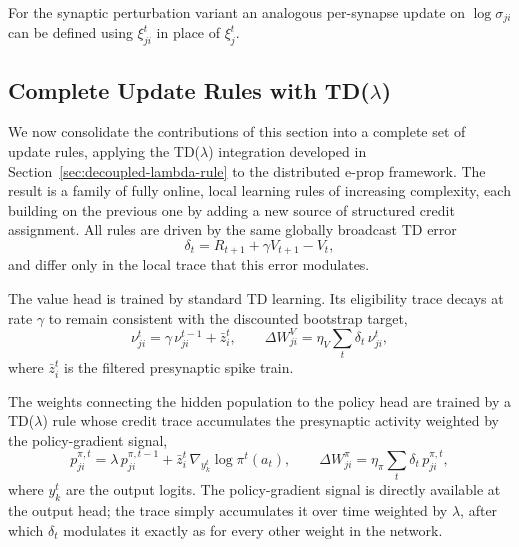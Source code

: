     For the synaptic perturbation variant an analogous per-synapse update on
    $\log\sigma_{ji}$ can be defined using $\xi_{ji}^t$ in place of $\xi_j^t$.

    \subsection{Complete Update Rules with TD($\lambda$)}
    \label{subsec:complete_update_rules}
    
    We now consolidate the contributions of this section into a complete set of
    update rules, applying the TD($\lambda$) integration developed in
    Section~\ref{sec:decoupled-lambda-rule} to the distributed e-prop framework. The
    result is a family of fully online, local learning rules of increasing
    complexity, each building on the previous one by adding a new source of
    structured credit assignment. All rules are driven by the same globally
    broadcast TD error
    \begin{equation}
    \delta_t = R_{t+1} + \gamma V_{t+1} - V_t,
    \label{eq:complete-tderror}
    \end{equation}
    and differ only in the local trace that this error modulates.
    
    The value head is trained by standard TD learning. Its eligibility trace decays
    at rate $\gamma$ to remain consistent with the discounted bootstrap target,
    \begin{equation}
    \nu_{ji}^t = \gamma\, \nu_{ji}^{t-1} + \bar{z}_i^t,
    \qquad
    \Delta W_{ji}^V = \eta_V \sum_t \delta_t\, \nu_{ji}^t,
    \label{eq:complete-critic}
    \end{equation}
    where $\bar{z}_i^t$ is the filtered presynaptic spike train.
    
    The weights connecting the hidden population to the policy head are trained by a
    TD($\lambda$) rule whose credit trace accumulates the presynaptic activity
    weighted by the policy-gradient signal,
    \begin{equation}
    p_{ji}^{\pi,t} = \lambda\, p_{ji}^{\pi,t-1}
    + \bar{z}_i^t \, \nabla_{y_k^t} \log \pi^t(a_t),
    \qquad
    \Delta W_{ji}^\pi = \eta_\pi \sum_t \delta_t\, p_{ji}^{\pi,t},
    \label{eq:complete-policy}
    \end{equation}
    where $y_k^t$ are the output logits. The policy-gradient signal is directly
    available at the output head; the trace simply accumulates it over time
    weighted by $\lambda$, after which $\delta_t$ modulates it exactly as for every
    other weight in the network.
    
